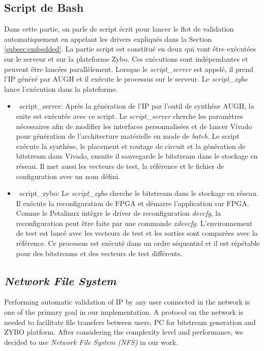 \subsection{Script de Bash}
Dans cette partie, on parle de script écrit pour lancer le flot de validation automatiquement 
en appelant les drivers expliqués dans la Section \ref{subsec:embedded}.
La partie script est constitué en deux qui vont être exécutées sur le serveur et 
sur la plateforme Zybo. Ces exécutions sont indépendantes et peuvent être
lancées parallèlement. Lorsque le \emph{script\_server} est appelé, il prend
l'IP généré par AUGH et il exécute le processus sur le serveur. Le \emph{script\_zybo}
lance l'exécution dans la plateforme.

\begin{itemize}
	\item\ script\_server:
	Après la génération de l'IP par l'outil de synthèse AUGH, la suite est exécutée avec ce script. Le \emph{script\_server}
	cherche les paramètres nécessaires afin de modifier les interfaces personnalisées et de lancer Vivado pour génération
	de l'architecture matérielle en mode de \emph{batch}. Le script exécute la synthèse, le placement et routage de circuit et 
	la génération de bitstream dans Vivado, ensuite il sauvegarde le bitstream dans le stockage en réseau.
	Il met aussi les vecteurs de test, la référence et le fichier de configuration avec un nom défini.

	\item\ script\_zybo:
	Le \emph{script\_zybo} cherche le bitstream dans le stockage en réseau. Il exécute la reconfiguration de FPGA et démarre
	l'application sur FPGA. Comme le Petalinux intègre le driver de reconfiguration \emph{devcfg}, la reconfiguration peut
	être faite par une commande \emph{xdevcfg}. L'environnement de test est lancé avec les vecteurs de test et les sorties
	sont comparées avec la référence. Ce processus est exécuté dans un ordre séquentiel et il est répétable pour des
	bitstreams et des vecteurs de test différents.
	
\end{itemize}

\subsection{\emph{Network File System}}
Performing automatic validation of IP by any user connected in the network is one of the primary goal in our implementation.
A protocol on the network is needed to facilitate file transfers between users, PC for bitstream generation and ZYBO platform.
After considering the complexity level and performance, we decided to use \emph{Network File System (NFS)} in our work.

